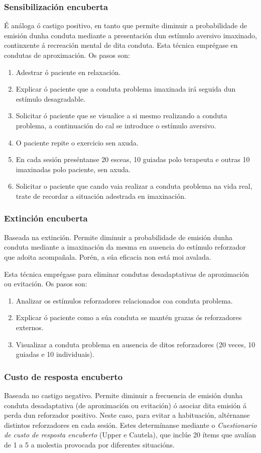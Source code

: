 \documentclass[a4paper,11pt]{article}
\begin{document}
\subsubsection{Sensibilización encuberta}
É análoga ó castigo positivo, en tanto que permite diminuir a probabilidade de emisión dunha conduta mediante a presentación dun estímulo aversivo imaxinado, continxente á recreación mental de dita conduta. Esta técnica emprégase en condutas de aproximación. Os pasos son:
\begin{enumerate}
	\item Adestrar ó paciente en relaxación.
	\item Explicar ó paciente que a conduta problema imaxinada irá seguida dun estímulo desagradable.
	\item Solicitar ó paciente que se visualice a si mesmo realizando a conduta problema, a 
	continuación do cal se introduce o estímulo aversivo.
	\item O paciente repite o exercicio sen axuda.
	\item En cada sesión preséntanse 20 esceas, 10 guiadas polo terapeuta e outras 10 imaxinadas 
	polo paciente, sen axuda.
	\item Solicitar o paciente que cando vaia realizar a conduta problema na vida real, trate de 
	recordar a situación adestrada en imaxinación.
\end{enumerate}

\subsubsection{Extinción encuberta}
Baseada na extinción. Permite diminuir a probabilidade de emisión dunha conduta mediante a imaxinación da mesma en ausencia do estímulo reforzador que adoita acompañala. Porén, a súa eficacia non está moi avalada. 

Esta técnica emprégase para eliminar condutas desadaptativas de aproximación ou evitación. Os pasos son:
\begin{enumerate}
	\item Analizar os estímulos reforzadores relacionados coa conduta problema.
	\item Explicar ó paciente como a súa conduta se mantén grazas ós reforzadores externos.
	\item Visualizar a conduta problema en ausencia de ditos reforzadores (20 veces, 10 guiadas e 10 
	individuais). 
\end{enumerate}

\subsubsection{Custo de resposta encuberto}
Baseada no castigo negativo. Permite diminuir a frecuencia de emisión dunha conduta desadaptativa (de aproximación ou evitación) ó asociar dita emisión á perda dun reforzador positivo. Neste caso, para evitar a habituación, altérnanse distintos reforzadores en cada sesión. Estes determínanse mediante o \textit{Cuestionario de custo de resposta encuberto} (Upper e Cautela), que inclúe 20 ítems que avalían de 1 a 5 a molestia provocada por diferentes situacións. 
\end{document}
